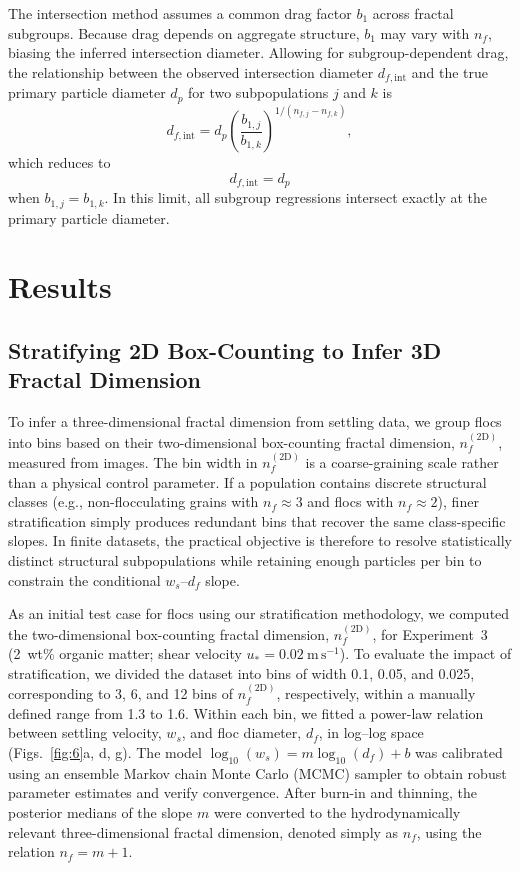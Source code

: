 \documentclass{agujournal2019}
\providecommand{\DIFadd}[1]{{\protect\color{blue}#1}}
\begin{document}
The intersection method assumes a common drag factor $b_1$ across fractal subgroups. Because drag depends on aggregate structure, $b_1$ may vary with $n_f$, biasing the inferred intersection diameter. Allowing for subgroup-dependent drag, the relationship between the observed intersection diameter $d_{f,\mathrm{int}}$ and the true primary particle diameter $d_p$ for two subpopulations $j$ and $k$ is
\begin{equation}
d_{f,\mathrm{int}} = d_p \left( \frac{b_{1,j}}{b_{1,k}} \right)^{1/(n_{f,j} - n_{f,k})},
\label{eq:dpintersection}
\end{equation}
which reduces to
\begin{equation}
d_{f,\mathrm{int}} = d_p
\label{eq:dpintersectionideal}
\end{equation}
when $b_{1,j}=b_{1,k}$. In this limit, all subgroup regressions intersect exactly at the primary particle diameter.


\section{Results}

\subsection{Stratifying 2D Box-Counting to Infer 3D Fractal Dimension}

\DIFadd{To infer a three-dimensional fractal dimension from settling data, we group flocs into bins based on their two-dimensional box-counting fractal dimension, $n_f^{(2\mathrm{D})}$, measured from images. The bin width in $n_f^{(2\mathrm{D})}$ is a coarse-graining scale rather than a physical control parameter. If a population contains discrete structural classes (e.g., non-flocculating grains with $n_f \approx 3$ and flocs with $n_f \approx 2$), finer stratification simply produces redundant bins that recover the same class-specific slopes. In finite datasets, the practical objective is therefore to resolve statistically distinct structural subpopulations while retaining enough particles per bin to constrain the conditional $w_s$--$d_f$ slope.}

As an initial test case for flocs using our stratification methodology, we computed the two-dimensional box-counting fractal dimension, $n_f^{(2\mathrm{D})}$, for Experiment~3 (2~wt\% organic matter; shear velocity $u_\ast = 0.02~\mathrm{m\,s^{-1}}$). To evaluate the impact of stratification, we divided the dataset into bins of width 0.1, 0.05, and 0.025, corresponding to 3, 6, and 12 bins of $n_f^{(2\mathrm{D})}$, respectively, within a manually defined range from 1.3 to 1.6. Within each bin, we fitted a power-law relation between settling velocity, $w_s$, and floc diameter, $d_f$, in log--log space (Figs.~\ref{fig:6}a, d, g). The model $\log_{10}(w_s) = m \log_{10}(d_f) + b$ was calibrated using an ensemble Markov chain Monte Carlo (MCMC) sampler to obtain robust parameter estimates and verify convergence. After burn-in and thinning, the posterior medians of the slope $m$ were converted to the hydrodynamically relevant three-dimensional fractal dimension, denoted simply as $n_f$, using the relation $n_f = m + 1$.
\end{document}
